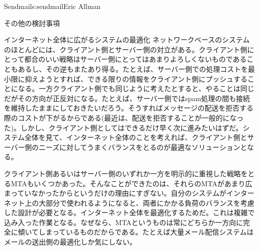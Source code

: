 \begin{aosachapter}{Sendmail}{s:sendmail}{Eric Allman}
\begin{aosasect1}{その他の検討事項}
\begin{aosasect2}{インターネット全体に広がるシステムの最適化}
ネットワークベースのシステムのほとんどには、クライアント側とサーバー側の対立がある。クライアント側にとって都合のいい戦略はサーバー側にとってはあまりよろしくないものであることもあるし、その逆もまたあり得る。たとえば、サーバー側での処理コストを最小限に抑えようとすれば、できる限りの情報をクライアント側にプッシュすることになる。一方クライアント側でも同じように考えたとすると、やることは同じだがその方向が正反対になる。たとえば、サーバー側ではspam処理の間も接続を維持したままにしておきたいだろう。そうすればメッセージの配送を拒否する際のコストが下がるからである(最近は、配送を拒否することが一般的になった)。しかし、クライアント側としてはできるだけ早く次に進みたいはずだ。システム全体を見て、インターネット全体のことを考えれば、クライアント側とサーバー側のニーズに対してうまくバランスをとるのが最適なソリューションとなる。

クライアント側あるいはサーバー側のいずれか一方を明示的に重視した戦略をとるMTAもいくつかあった。そんなことができたのは、それらのMTAがあまり広まっていなかったからというだけの理由にすぎない。自分のシステムがインターネット上の大部分で使われるようになると、両者にかかる負荷のバランスを考慮した設計が必要となる。インターネット全体を最適化するためだ。これは複雑で込み入った作業となる。なぜなら、MTAというものは常にどちらか一方向に完全に傾いてしまっているものだからである。たとえば大量メール配信システムはメールの送出側の最適化しか気にしない。


\end{aosasect2}
\end{aosasect1}
\end{aosachapter}
